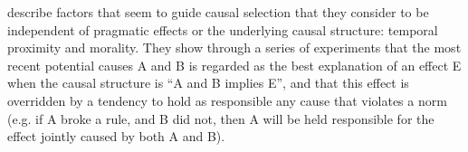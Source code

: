 \documentclass[10pt,letterpaper]{article}
\begin{document}
 describe factors that seem to guide causal selection that they consider to be independent of pragmatic effects or the underlying causal structure: temporal proximity and morality. They show through a series of experiments that the most recent potential causes A and B is regarded as the best explanation of an effect E when the causal structure is ``A and B implies E'', and that this effect is overridden by a tendency to hold as responsible any cause that violates a norm (e.g. if A broke a rule, and B did not, then A will be held responsible for the effect jointly caused by both A and B).



\setlength{\bibleftmargin}{.125in}
\setlength{\bibindent}{-\bibleftmargin}


\end{document}
